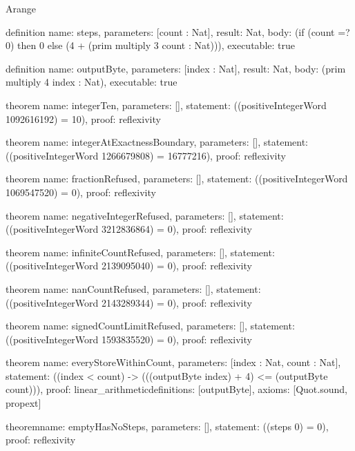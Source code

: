 \begin{lexlean}{Arange}
\begin{semanticmodule}
definition{
  name: steps,
  parameters: [count : Nat],
  result: Nat,
  body: (if (count =? 0) then 0 else (4 + (prim multiply 3 count : Nat))),
  executable: true
}

definition{
  name: outputByte,
  parameters: [index : Nat],
  result: Nat,
  body: (prim multiply 4 index : Nat),
  executable: true
}

theorem{
  name: integerTen,
  parameters: [],
  statement: ((positiveIntegerWord 1092616192) = 10),
  proof: reflexivity{}
}

theorem{
  name: integerAtExactnessBoundary,
  parameters: [],
  statement: ((positiveIntegerWord 1266679808) = 16777216),
  proof: reflexivity{}
}

theorem{
  name: fractionRefused,
  parameters: [],
  statement: ((positiveIntegerWord 1069547520) = 0),
  proof: reflexivity{}
}

theorem{
  name: negativeIntegerRefused,
  parameters: [],
  statement: ((positiveIntegerWord 3212836864) = 0),
  proof: reflexivity{}
}

theorem{
  name: infiniteCountRefused,
  parameters: [],
  statement: ((positiveIntegerWord 2139095040) = 0),
  proof: reflexivity{}
}

theorem{
  name: nanCountRefused,
  parameters: [],
  statement: ((positiveIntegerWord 2143289344) = 0),
  proof: reflexivity{}
}

theorem{
  name: signedCountLimitRefused,
  parameters: [],
  statement: ((positiveIntegerWord 1593835520) = 0),
  proof: reflexivity{}
}

theorem{
  name: everyStoreWithinCount,
  parameters: [index : Nat, count : Nat],
  statement: ((index < count) -> (((outputByte index) + 4) <= (outputByte count))),
  proof: linear_arithmetic{definitions: [outputByte]},
  axioms: [Quot.sound, propext]
}

theorem{name: emptyHasNoSteps, parameters: [], statement: ((steps 0) = 0), proof: reflexivity{}}
\end{semanticmodule}
\end{lexlean}
